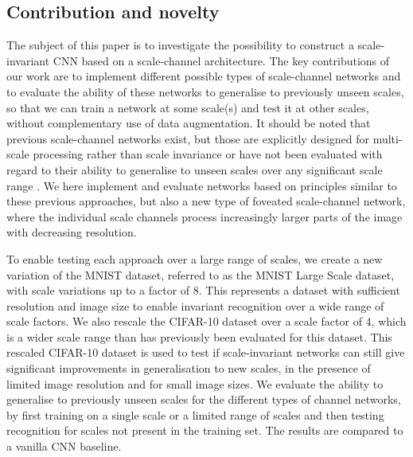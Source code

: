 \documentclass[twocolumn,runningheads]{svjour3}
\begin{document}
\subsection{Contribution and novelty}

The subject of this paper is to investigate the possibility to
construct a scale-invariant CNN based on a scale-channel
architecture.
The key contributions of our work are to implement
different possible types of scale-channel networks and to evaluate the
ability of these networks to generalise to previously unseen scales,
so that we can train a network at some scale(s) and
test it at other scales, without complementary use of data
augmentation. 
It should be noted that previous scale-channel networks exist, but
those are explicitly designed for multi-scale processing
\cite{FarCouNajLeC13-PAMI,NooPos16-PR} rather than scale invariance or
have not been evaluated with regard to their ability to generalise to
unseen scales over any significant scale range
\cite{XuXiaZhaYanZha14-arXiv}. We here implement and evaluate networks
based on principles similar to these previous approaches, but also a
new type of foveated scale-channel network, where the individual scale
channels process increasingly larger parts of the image with
decreasing resolution. 

To enable testing each approach over a large range of scales, we create 
a new variation of the MNIST dataset, referred to as the MNIST Large Scale dataset, 
with scale variations up to a factor of 8. This represents a dataset
with sufficient resolution and image size to enable invariant recognition 
over a wide range of scale factors. We also rescale the CIFAR-10
dataset over a scale factor of 4, which is a wider scale range than 
has previously been evaluated for this dataset. This rescaled CIFAR-10 
dataset is used to test if scale-invariant networks can still give 
significant improvements in generalisation to new scales, 
in the presence of limited image resolution and for small image sizes. 
We evaluate the ability to generalise to previously unseen scales for
the different types of channel networks, by first training on a single
scale or a limited range of scales and then testing recognition for
scales not present in the training set. The results are compared to a
vanilla CNN baseline.
\end{document}
